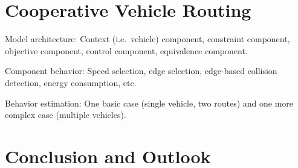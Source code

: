 \documentclass[conference]{../cls/IEEEtran}
\begin{document}
\section{Cooperative Vehicle Routing}

Model architecture: Context (i.e.\ vehicle) component, constraint component, objective component, control component, equivalence component.

Component behavior: Speed selection, edge selection, edge-based collision detection, energy consumption, etc.

Behavior estimation: One basic case (single vehicle, two routes) and one more complex case (multiple vehicles).

\section{Conclusion and Outlook}



\end{document}
